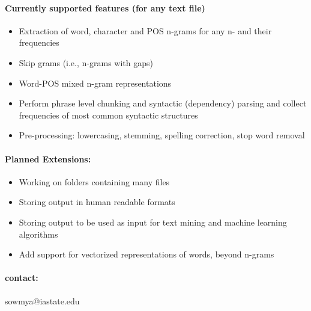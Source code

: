 \documentclass{article}
\begin{document}
\paragraph{Currently supported features (for any text file)}
\begin{itemize}
\item Extraction of word, character and POS n-grams for any n- and their frequencies
\item Skip grams (i.e., n-grams with gaps)
\item Word-POS mixed n-gram representations
\item Perform phrase level chunking and syntactic (dependency) parsing and collect frequencies of most common syntactic structures
\item Pre-processing: lowercasing, stemming, spelling correction, stop word removal
\end{itemize}

\paragraph{Planned Extensions: }
\begin{itemize}
\item Working on folders containing many files
\item Storing output in human readable formats
\item Storing output to be used as input for text mining and machine learning algorithms
\item Add support for vectorized representations of words, beyond n-grams
\end{itemize}

\paragraph{contact: } sowmya@iastate.edu
\end{document}
